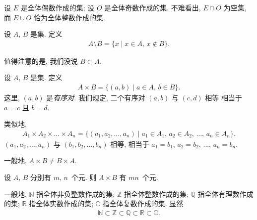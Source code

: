 \begin{example}
    设 $E$ 是全体偶数作成的集;
    设 $O$ 是全体奇数作成的集.
    不难看出, $E \cap O$ 为空集,
    而 $E \cup O$ 恰为全体整数作成的集.
\end{example}

\begin{definition}
    设 $A$, $B$ 是集. 定义
    \begin{align*}
        A \setminus B = \{ x \mid \text{$x \in A$, $x \notin B$} \}.
    \end{align*}
\end{definition}

\begin{remark}
    值得注意的是, 我们没说 $B \subset A$.
\end{remark}

\begin{definition}
    设 $A$, $B$ 是集. 定义
    \begin{align*}
        A \times B = \{ (a,b) \mid \text{$a \in A$, $b \in B$} \}.
    \end{align*}
    这里, $(a, b)$ 是\emph{有序对}.
    我们规定,
    二个有序对 $(a, b)$ 与 $(c, d)$ 相等%
    相当于 $a = c$ 且 $b = d$.

    类似地,
    \begin{align*}
        A_1 \times A_2 \times \dots \times A_n
        = \{ (a_1, a_2, \dots, a_n) \mid \text{$a_1 \in A_1$, $a_2 \in A_2$, $\dots$, $a_n \in A_n$} \}.
    \end{align*}
    $(a_1, a_2, \dots, a_n)$ 与 $(b_1, b_2, \dots, b_n)$ 相等,
    相当于 $a_1 = b_1$, $a_2 = b_2$, $\dots$, $a_n = b_n$.
\end{definition}

\begin{remark}
    一般地, $A \times B \neq B \times A$.
\end{remark}

\begin{remark}
    设 $A$, $B$ 分别有 $m$, $n$~个元.
    则 $A \times B$ 有 $mn$~个元.
\end{remark}

\begin{definition}
    一般地,
    $\mathbb{N}$ 指全体非负整数作成的集;
    $\mathbb{Z}$ 指全体整数作成的集;
    $\mathbb{Q}$ 指全体有理数作成的集;
    $\mathbb{R}$ 指全体实数作成的集;
    $\mathbb{C}$ 指全体复数作成的集. 显然
    \begin{align*}
        \mathbb{N} \subset \mathbb{Z} \subset \mathbb{Q} \subset \mathbb{R} \subset \mathbb{C}.
    \end{align*}
\end{definition}

